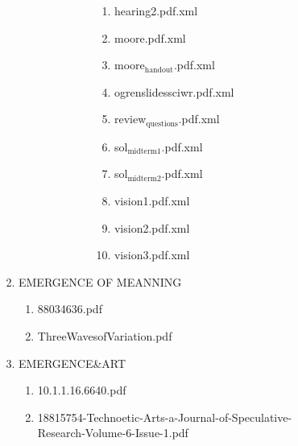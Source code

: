 \documentclass[11pt]{article}
\begin{document}
\begin{enumerate}
\begin{enumerate}
\begin{enumerate}
\begin{enumerate}
\begin{enumerate}
\begin{enumerate}
\begin{enumerate}
\begin{enumerate}
\begin{enumerate}
\begin{enumerate}
\item hearing2.pdf.xml
\label{sec-1-1-1-1-7-3-24-12-1-2-1-1-6}

\item moore.pdf.xml
\label{sec-1-1-1-1-7-3-24-12-1-2-1-1-7}

\item moore$_{\text{handout}}$.pdf.xml
\label{sec-1-1-1-1-7-3-24-12-1-2-1-1-8}

\item ogrenslidessciwr.pdf.xml
\label{sec-1-1-1-1-7-3-24-12-1-2-1-1-9}

\item review$_{\text{questions}}$.pdf.xml
\label{sec-1-1-1-1-7-3-24-12-1-2-1-1-10}

\item sol$_{\text{midterm1}}$.pdf.xml
\label{sec-1-1-1-1-7-3-24-12-1-2-1-1-11}

\item sol$_{\text{midterm2}}$.pdf.xml
\label{sec-1-1-1-1-7-3-24-12-1-2-1-1-12}

\item vision1.pdf.xml
\label{sec-1-1-1-1-7-3-24-12-1-2-1-1-13}

\item vision2.pdf.xml
\label{sec-1-1-1-1-7-3-24-12-1-2-1-1-14}

\item vision3.pdf.xml
\label{sec-1-1-1-1-7-3-24-12-1-2-1-1-15}
\end{enumerate}
\end{enumerate}
\end{enumerate}
\end{enumerate}
\end{enumerate}

\item EMERGENCE OF MEANNING
\label{sec-1-1-1-1-7-3-24-13}
\begin{enumerate}
\item 88034636.pdf
\label{sec-1-1-1-1-7-3-24-13-1}

\item ThreeWavesofVariation.pdf
\label{sec-1-1-1-1-7-3-24-13-2}
\end{enumerate}

\item EMERGENCE\&ART
\label{sec-1-1-1-1-7-3-24-14}
\begin{enumerate}
\item 10.1.1.16.6640.pdf
\label{sec-1-1-1-1-7-3-24-14-1}

\item 18815754-Technoetic-Arts-a-Journal-of-Speculative-Research-Volume-6-Issue-1.pdf
\label{sec-1-1-1-1-7-3-24-14-2}


\end{enumerate}
\end{enumerate}
\end{enumerate}
\end{enumerate}
\end{enumerate}
\end{enumerate}
\end{document}
